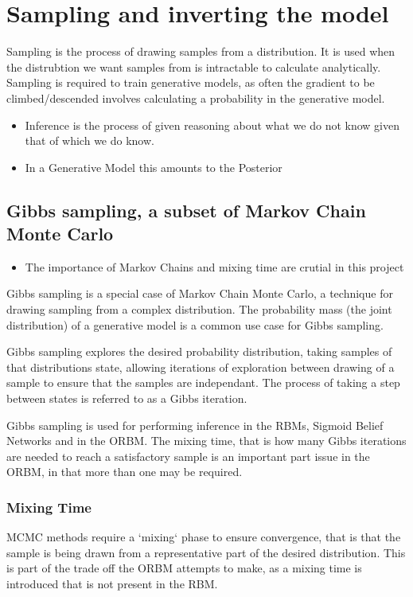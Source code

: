 \section{Sampling and inverting the model}
Sampling is the process of drawing samples from a distribution. It is used when the distrubtion we want samples from is intractable to calculate analytically. Sampling is required to train generative models, as often the gradient to be climbed/descended involves calculating a probability in the
generative model.
\todo%
\begin{itemize}
  \item Inference is the process of given reasoning about what we do not know given that of which we do know.
  \item In a Generative Model this amounts to the Posterior
\end{itemize}

\subsection{Gibbs sampling, a subset of Markov Chain Monte Carlo}

\begin{itemize}
  \item The importance of Markov Chains and mixing time are crutial in this project
\end{itemize}

Gibbs sampling is a special case of Markov Chain Monte Carlo, a technique for drawing sampling from a complex distribution. The probability mass (the joint distribution) of a generative model is a common use case for Gibbs sampling.

Gibbs sampling explores the desired probability distribution, taking samples of that distributions state, allowing iterations of exploration between drawing of a sample to ensure that the samples are independant. The process of taking a step between states is referred to as a Gibbs iteration.

Gibbs sampling is used for performing inference in the RBMs, Sigmoid Belief Networks and in the ORBM. The mixing time, that is how many Gibbs iterations are needed to reach a satisfactory sample is an important part issue in the ORBM, in that more than one may be required.

\subsubsection{Mixing Time}
MCMC methods require a `mixing` phase to ensure convergence, that is that the sample is being drawn from a representative part of the desired distribution. This is part of the trade off the ORBM attempts to make, as a mixing time is introduced that is not present in the RBM.

